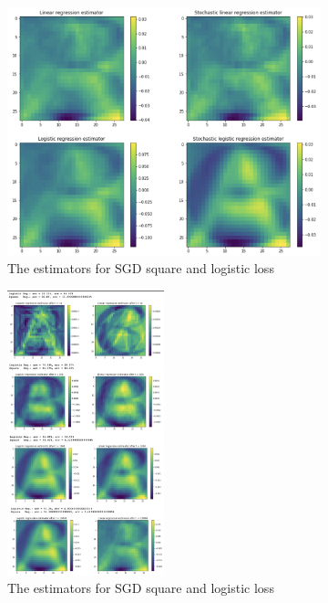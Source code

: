 \documentclass[10pt,a4paper]{article}
\begin{document}
\begin{figure}[h!]
\begin{subfigure}[b] {0.5 \textwidth}
\includegraphics[width = \textwidth]{figures/theta}
\centering
\caption{The estimators for SGD square and logistic loss}
\end{subfigure}
\begin{subfigure}[b]{0.5 \textwidth}
\includegraphics[width = 0.5\textwidth]{figures/t}
\centering
\caption{The estimators for SGD square and logistic loss}
\end{subfigure}
\caption{}
\end{figure}
\end{document}

